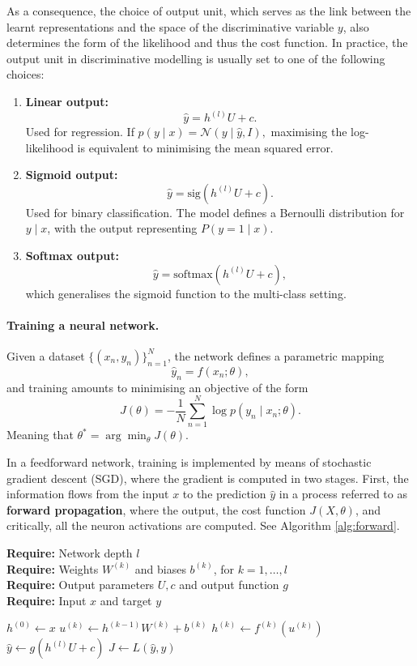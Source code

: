As a consequence, the choice of {output unit}, which serves as the link between the learnt representations and the space of the discriminative variable $y$, also determines the form of the likelihood and thus the cost function. In practice, the output unit in discriminative modelling is usually set to one of the following choices:
\begin{enumerate}
    \item \textbf{Linear output:}
    \[
    \hat{y} = h^{(l)}U + c.
    \]
    Used for regression. If 
    \(
    p(y \mid x) = \mathcal{N}(y \mid \hat{y}, I),
    \)
    maximising the log-likelihood is equivalent to minimising the mean squared error.

    \item \textbf{Sigmoid output:}
    \[
    \hat{y} = \mathrm{sig}\!\left(h^{(l)}U + c\right).
    \]
    Used for binary classification. The model defines a Bernoulli distribution for $y \mid x$, with the output representing $P(y=1 \mid x)$.

    \item \textbf{Softmax output:}
    \[
    \hat{y} = \mathrm{softmax}\!\left(h^{(l)}U + c\right),
    \]
    which generalises the sigmoid function to the multi-class setting.
\end{enumerate}


\paragraph{Training a neural network.}

Given a dataset $\{(x_n, y_n)\}_{n=1}^N$, the network defines a parametric mapping
\[
\hat{y}_n = f(x_n;\theta),
\]
and training amounts to minimising an objective of the form
\[
J(\theta) = - \frac{1}{N}\sum_{n=1}^N \log p(y_n \mid x_n; \theta).
\]
Meaning that 
\(
\theta^{*} = \arg\min_{\theta} J(\theta).
\)

In a feedforward network, training is implemented by means of stochastic gradient descent (SGD), where the gradient is computed in two stages. First, the information flows from the input $x$ to the prediction $\hat{y}$ in a process referred to as \textbf{forward propagation}, where the output, the cost function $J(X,\theta)$, and critically, all the neuron activations are computed. See Algorithm \ref{alg:forward}.

\begin{algorithm}[H]
	\caption{Forward Propagation}
    \label{alg:forward}
	\textbf{Require:} Network depth $l$ \\
	\textbf{Require:} Weights $W^{(k)}$ and biases $b^{(k)}$, for $k=1,\dots,l$ \\
	\textbf{Require:} Output parameters $U,c$ and output function $g$ \\
	\textbf{Require:} Input $x$ and target $y$
	\begin{algorithmic}[1]
		\State $h^{(0)} \gets x$
			\State $u^{(k)} \gets h^{(k-1)}W^{(k)} + b^{(k)}$
			\State $h^{(k)} \gets f^{(k)}(u^{(k)})$
		\EndFor
		\State $\hat{y} \gets g(h^{(l)}U + c)$
		\State $J \gets L(\hat{y}, y)$
	\end{algorithmic}
\end{algorithm}

